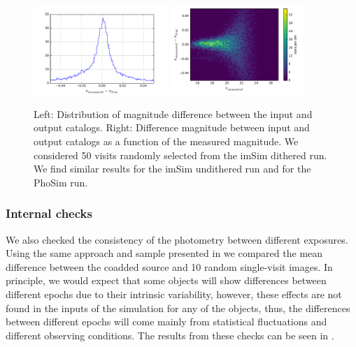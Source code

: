 \documentclass[\docopts]{\docclass}
\begin{document}
\begin{figure}
  \centering
  \includegraphics[width=0.45\textwidth]{photometry_imsim_dithered_50visits_hist}
  \includegraphics[width=0.45\textwidth]{photometry_imsim_dithered_50visits}
  \caption{Left: Distribution of magnitude difference between the input and output catalogs.
  Right: Difference magnitude between input and output catalogs as a function of the measured magnitude. We considered 50 visits
  randomly selected from the imSim dithered run. We find similar results for the imSim undithered run and for the PhoSim run.}
  \label{fig:photometry_a}
\end{figure}

\subsubsection{Internal checks}
\label{sec:internal_photometry}

We also checked the consistency of the photometry between different exposures. Using the same approach and sample presented in
 we compared the mean difference between the coadded source and 10 random single-visit images. In
principle, we would expect that some objects will show differences between different epochs due to their intrinsic variability, however,
these effects are not found in the inputs of the simulation for any of the objects, thus, the differences between different epochs will come mainly
from statistical fluctuations and different observing conditions. The results from these checks can be seen in .
\end{document}
